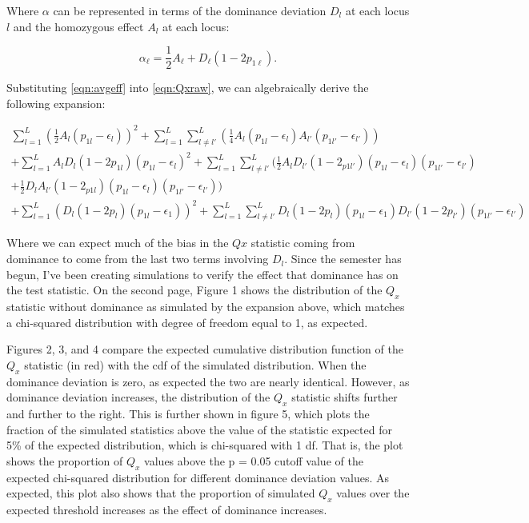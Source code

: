 \documentclass[a4paper,10pt]{article}
\begin{document}
Where $\alpha$ can be represented in terms of the dominance deviation
$D_l$ at each locus $l$ and
the homozygous effect $A_l$ at each
locus:

\begin{equation}  \label{eqn:avgeff}
  \alpha_\ell = \frac{1}{2} A_\ell + D_\ell\left(1-2p_{1\ell}\right).
\end{equation}

Substituting \eqref{eqn:avgeff} into \eqref{eqn:Qxraw}, we can
algebraically derive the following expansion:

\begin{equation}
  \begin{split}
  \sum^L_{l=1}( \frac{1}{2}A_l(p_{1l}-\epsilon_l))^2+\sum^L_{l=1}\sum^L_{
    l \neq l'}(\frac{1}{4}A_l(p_{1l}-\epsilon_{l})A_{l'}(p_{1l'}-\epsilon_{l'}))
  \\
  +\sum^L_{l=1}A_lD_l(1-2p_{1l})(p_{1l}-\epsilon_l)^2 +
  \sum^L_{l=1}\sum^L_{l \neq
    l'}(\frac{1}{2}A_lD_{l'}(1-2_{p1l'})(p_{1l}-\epsilon_l)(p_{1l'}-\epsilon_{l'}) \\
  + \frac{1}{2}D_lA_{l'}(1-2_{p1l})(p_{1l}-\epsilon_l)(p_{1l'}-\epsilon_{l'})) \\
   + \sum^L_{l=1} (D_l(1-2p_l)(p_{1l}-\epsilon_{1}))^2
   + \sum^L_{l=1}\sum^L_{l \neq
     l'}D_{l}(1-2p_{l})(p_{1l}-\epsilon_{1})D_{l'}(1-2p_{l'})(p_{1l'}-\epsilon_{l'}) \label{second_exp_ult}
  \end{split}
\end{equation}

Where we can expect much of the bias in the $Qx$ statistic coming from
dominance to come from the last two terms involving $D_l$. Since the
semester has begun, I've been creating simulations to verify the
effect that dominance has on the test statistic. On the second page,
Figure 1 shows the distribution of the $Q_x$ statistic without dominance as simulated by
the expansion above, which matches a chi-squared distribution with
degree of freedom equal to 1, as expected.

Figures 2, 3, and 4 compare the expected cumulative distribution
function of the $Q_x$ statistic (in red) with the cdf of the simulated
distribution. When the dominance deviation is zero, as expected the
two are nearly identical. However, as dominance deviation increases,
the distribution of the $Q_x$ statistic shifts further and further to
the right. This is further shown in figure 5, which plots the fraction
of the simulated statistics above the value of the statistic expected
for 5\% of the expected distribution, which is chi-squared with 1
df. That is, the plot shows the proportion of $Q_x$ values above the p = 0.05 cutoff value
of the expected chi-squared distribution for different dominance
deviation values. As expected, this plot also
shows that the proportion of simulated $Q_x$ values over the expected
threshold increases as the effect of dominance increases.
\end{document}
